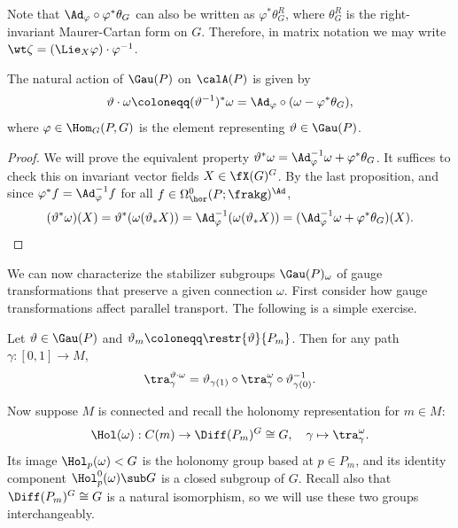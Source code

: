 \begin{rem}
    Note that $\Ad_\varphi\circ \varphi^\ast\theta_G$ can also be written as $\varphi^\ast\theta_G^R$, where $\theta_G^R$ is the right-invariant Maurer-Cartan form on $G$. Therefore, in matrix notation we may write $\wt\zeta=(\Lie_X\varphi)\cdot \varphi^{-1}$.
\end{rem}

\begin{prop}\label{prop action of Gau(P) on calA(P)}
    The natural action of $\Gau(P)$ on $\calA(P)$ is given by
    \[\vartheta\cdot\omega\coloneqq (\vartheta^{-1})^\ast\omega=\Ad_\varphi \circ (\omega-\varphi^\ast \theta_G),\]
    where $\varphi\in \Hom_G(P,G)$ is the element representing $\vartheta\in \Gau(P)$.
\end{prop}
\begin{proof}
    We will prove the equivalent property $\vartheta^\ast\omega=\Ad_\varphi^{-1}\omega+\varphi^\ast\theta_G$. It suffices to check this on invariant vector fields $X\in \fX(G)^G$. By the last proposition, and since $\varphi^\ast f=\Ad_\varphi^{-1}f$ for all $f\in \Omega^0_{\hor}(P;\frakg)^\Ad$, 
    \[(\vartheta^\ast\omega)(X)=\vartheta^\ast(\omega(\vartheta_\ast X))=\Ad_\varphi^{-1}(\omega(\vartheta_\ast X))=(\Ad_\varphi^{-1}\omega+\varphi^\ast\theta_G)(X).\]
\end{proof}

We can now characterize the stabilizer subgroups $\Gau(P)_\omega$ of gauge transformations that preserve a given connection $\omega$. First consider how gauge transformations affect parallel transport. The following is a simple exercise.

\begin{lem}\label{lem 31794}
    Let $\vartheta\in\Gau(P)$ and $\vartheta_m\coloneqq\restr{\vartheta}{P_m}$. Then for any path $\gamma:[0,1]\to M$, 
    \[\tra_{\gamma}^{\vartheta\cdot\omega}=\vartheta_{\gamma(1)}\circ\tra_\gamma^\omega \circ\vartheta_{\gamma(0)}^{-1}.\]
\end{lem}

Now suppose $M$ is connected and recall the holonomy representation for $m\in M$:
\[\Hol(\omega):C(m)\to \Diff(P_m)^G\cong G,\quad \gamma\mapsto \tra_\gamma^\omega.\]
Its image $\Hol_p(\omega)< G$ is the holonomy group based at $p\in P_m$, and its identity component $\Hol^0_p(\omega)\sub G$ is a closed subgroup of $G$. Recall also that $\Diff(P_m)^G\cong G$ is a natural isomorphism, so we will use these two groups interchangeably.

